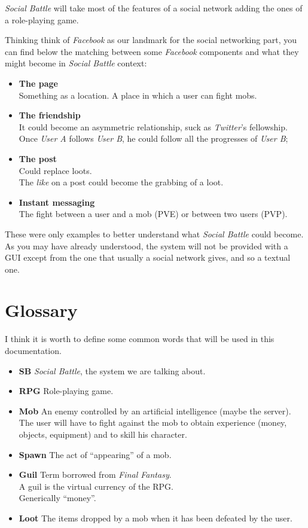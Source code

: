 		\noindent\textit{Social Battle} will take most of the features of a social network adding the 
		ones of a role-playing game.

		\noindent Thinking think of \textit{Facebook} as our landmark for the social networking part, 
		you can find below the matching between some \textit{Facebook} components and what 
		they might become in \textit{Social Battle} context:
		\begin{itemize}
			\item \textbf{The page}\\
			Something as a location. A place in which a user can fight mobs.

			\item \textbf{The friendship}\\
			It could become an asymmetric relationship, suck as \textit{Twitter}'s fellowship.
			Once \textit{User A} follows \textit{User B}, he could follow all the progresses
			of \textit{User B};

			\item \textbf{The post}\\
			Could replace loots.\\
			The \textit{like} on a post could become the grabbing of a loot.

			\item \textbf{Instant messaging}\\
			The fight between a user and a mob (PVE) or between two users (PVP).
		\end{itemize}

		\noindent These were only examples to better understand what \textit{Social Battle} could become.\\
		As you may have already understood, the system will not be provided with a GUI except from the one 
		that usually a social network gives, and so a textual one.

	\section{Glossary}
	I think it is worth to define some common words that will be used in this documentation.
	\begin{itemize}
		\item \textbf{SB} \textit{Social Battle}, the system we are talking about.
		\item \textbf{RPG} Role-playing game.
		\item \textbf{Mob} An enemy controlled by an artificial intelligence (maybe the server).\\
			The user will have to fight against the mob to obtain experience (money, objects, equipment)
			and to skill his character.
		\item \textbf{Spawn} The act of ``appearing'' of a mob.
		\item \textbf{Guil} Term borrowed from \textit{Final Fantasy}.\\
			A guil is the virtual currency of the RPG.\\
			Generically ``money''.
		\item \textbf{Loot} The items dropped by a mob when it has been defeated by the user.
	\end{itemize}

